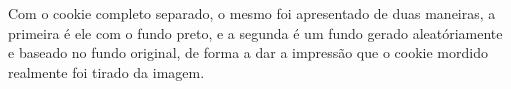 \documentclass[conference]{IEEEtran}
\begin{document}
Com o cookie completo separado, o mesmo foi apresentado de duas maneiras, a primeira é ele com o fundo
preto, e a segunda é um fundo gerado aleatóriamente e baseado no fundo original, de forma a dar a impressão que
o cookie mordido realmente foi tirado da imagem. 
%
%



%
%
\end{document}
